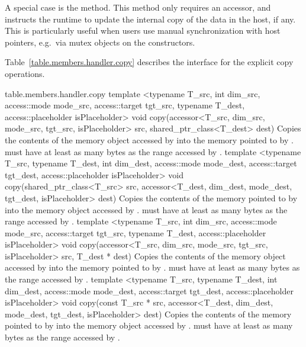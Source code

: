 A special case is the  method. 
This method only requires an accessor, and instructs the runtime to update
the internal copy of the data in the host, if any. This is particularly
useful when users use manual synchronization with host pointers, e.g.\ 
via mutex objects on the  constructors.

Table~\ref{table.members.handler.copy} describes the interface for the
explicit copy operations.

\startTable{Member function}
{table.members.handler.copy}
  \addRowTwoL
    {template <typename T_src, int dim_src, access::mode mode_src, access::target tgt_src, typename T_dest, access::placeholder isPlaceholder>}
    {void copy(accessor<T_src, dim_src, mode_src, tgt_src, isPlaceholder> src, shared_ptr_class<T_dest> dest)}
    { Copies the contents of the memory object accessed by
       into the memory pointed to by .
      \codeinline{dest} must have at least as many bytes as the
      range accessed by .}
  \addRowTwoL
    {template <typename T_src, typename T_dest, int dim_dest, access::mode mode_dest, access::target tgt_dest, access::placeholder isPlaceholder>}
    {void copy(shared_ptr_class<T_src> src, accessor<T_dest, dim_dest, mode_dest, tgt_dest, isPlaceholder> dest)}
    { Copies the contents of the memory pointed to by 
      into the memory object accessed by .
      \codeinline{src} must have at least as many bytes as the
      range accessed by \codeinline{dest}.}
  \addRowTwoL
    {template <typename T_src, int dim_src, access::mode mode_src, access::target tgt_src, typename T_dest, access::placeholder isPlaceholder>}
    {void copy(accessor<T_src, dim_src, mode_src, tgt_src, isPlaceholder> src, T_dest * dest)}
    { Copies the contents of the memory object accessed by
       into the memory pointed to by .
      \codeinline{dest} must have at least as many bytes as the
      range accessed by .}
  \addRowTwoL
    {template <typename T_src, typename T_dest, int dim_dest, access::mode mode_dest, access::target tgt_dest, access::placeholder isPlaceholder>}
    {void copy(const T_src * src, accessor<T_dest, dim_dest, mode_dest, tgt_dest, isPlaceholder> dest)}
    { Copies the contents of the memory pointed to by 
      into the memory object accessed by .
      \codeinline{src} must have at least as many bytes as the
      range accessed by \codeinline{dest}.}
